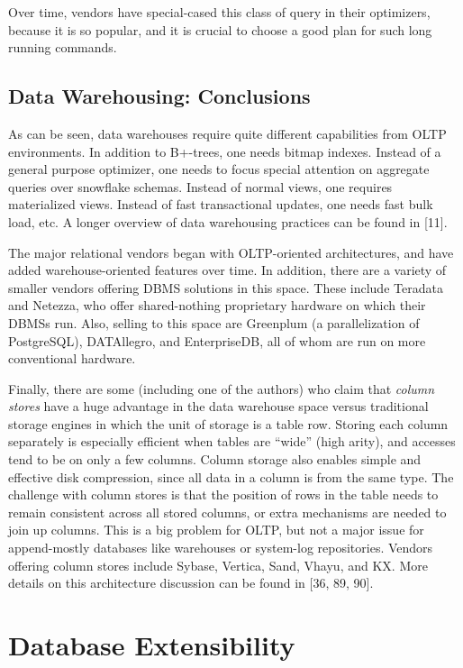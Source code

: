 \documentclass[b5paper,11pt,twoside,openright]{book}
\begin{document}
Over time, vendors have special-cased this class of query in their
optimizers, because it is so popular, and it is crucial to choose a good
plan for such long running commands.

\hypertarget{data-warehousing-conclusions}{%
\subsection{Data Warehousing:
Conclusions}\label{data-warehousing-conclusions}}

As can be seen, data warehouses require quite different capabilities
from OLTP environments. In addition to B+-trees, one needs bitmap
indexes. Instead of a general purpose optimizer, one needs to focus
special attention on aggregate queries over snowflake schemas. Instead
of normal views, one requires materialized views. Instead of fast
transactional updates, one needs fast bulk load, etc. A longer overview
of data warehousing practices can be found in {[}11{]}.

The major relational vendors began with OLTP-oriented architectures, and
have added warehouse-oriented features over time. In addition, there are
a variety of smaller vendors offering DBMS solutions in this space.
These include Teradata and Netezza, who offer shared-nothing proprietary
hardware on which their DBMSs run. Also, selling to this space are
Greenplum (a parallelization of PostgreSQL), DATAllegro, and
EnterpriseDB, all of whom are run on more conventional hardware.

Finally, there are some (including one of the authors) who claim that
\emph{column stores} have a huge advantage in the data warehouse space
versus traditional storage engines in which the unit of storage is a
table row. Storing each column separately is especially efficient when
tables are ``wide'' (high arity), and accesses tend to be on only a few
columns. Column storage also enables simple and effective disk
compression, since all data in a column is from the same type. The
challenge with column stores is that the position of rows in the table
needs to remain consistent across all stored columns, or extra
mechanisms are needed to join up columns. This is a big problem for
OLTP, but not a major issue for append-mostly databases like warehouses
or system-log repositories. Vendors offering column stores include
Sybase, Vertica, Sand, Vhayu, and KX. More details on this architecture
discussion can be found in {[}36, 89, 90{]}.

\hypertarget{database-extensibility}{%
\section{Database Extensibility}\label{database-extensibility}}
\end{document}

